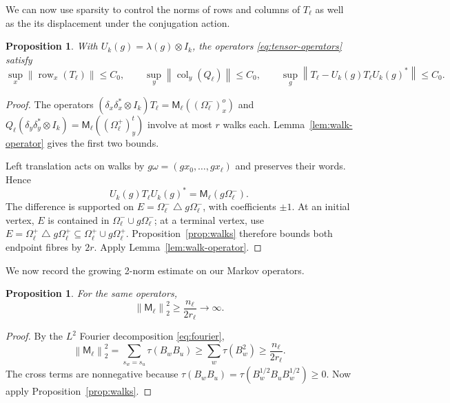 \documentclass[a4paper,11pt]{amsproc}
\numberwithin{equation}{section}
\newtheorem{proposition}[theorem]{Proposition}
\theoremstyle{definition}
\newcommand{\norm}[1]{\left\lVert#1\right\rVert}
\DeclareMathOperator{\row}{row}
\DeclareMathOperator{\col}{col}
\begin{document}
We can now use sparsity to control the norms of rows and columns of $T_\ell$ as well as the its displacement under the conjugation action.

\begin{proposition}\label{prop:uniform}
With $U_k(g)=\lambda(g)\otimes I_k$, the operators \eqref{eq:tensor-operators} satisfy
\begin{equation}\label{eq:uniform}
 \sup_x\norm{\row_x(T_\ell)}\le C_0,\qquad
 \sup_y\norm{\col_y(Q_\ell)}\le C_0,\qquad
 \sup_g\norm{T_\ell-U_k(g)T_\ell U_k(g)^*}\le C_0.
\end{equation}
\end{proposition}
\begin{proof}
The operators
$(\delta_x\delta_x^*\otimes I_k)T_\ell
=\mathsf M_\ell((\Omega_\ell^-)_x^o)$ and
$Q_\ell(\delta_y\delta_y^*\otimes I_k)
=\mathsf M_\ell((\Omega_\ell^+)_y^t)$
involve at most $r$ walks each. Lemma~\ref{lem:walk-operator} gives the first two bounds.

Left translation acts on walks by $g\omega=(gx_0,\ldots,gx_\ell)$ and preserves their words. Hence
\[
 U_k(g)T_\ell U_k(g)^*=\mathsf M_\ell(g\Omega_\ell^-).
\]
The difference is supported on $E=\Omega_\ell^-\mathbin{\triangle}g\Omega_\ell^-$, with coefficients $\pm1$. At an initial vertex, $E$ is contained in $\Omega_\ell^-\cup g\Omega_\ell^-$; at a terminal vertex, use
$E=\Omega_\ell^+\mathbin{\triangle}g\Omega_\ell^+\subseteq\Omega_\ell^+\cup g\Omega_\ell^+$.
Proposition~\ref{prop:walks} therefore bounds both endpoint fibres by $2r$. Apply Lemma~\ref{lem:walk-operator}.
\end{proof}

We now record the growing 2-norm estimate on our Markov operators.

\begin{proposition}\label{prop:growth}
For the same operators,
\begin{equation}\label{eq:growth}
 \norm{\mathsf M_\ell}_2^2\ge\frac{n_\ell}{2r_\ell}\longrightarrow\infty.
\end{equation}
\end{proposition}
\begin{proof}
By the $L^2$ Fourier decomposition \eqref{eq:fourier},
\begin{equation}\label{eq:energy}
 \norm{\mathsf M_\ell}_2^2
 =\sum_{s_w=s_u}\tau(B_wB_u)
 \ge\sum_w\tau(B_w^2)\ge\frac{n_\ell}{2r_\ell}.
\end{equation}
The cross terms are nonnegative because
$\tau(B_wB_u)=\tau(B_w^{1/2}B_uB_w^{1/2})\ge0$.
Now apply Proposition~\ref{prop:walks}.
\end{proof}
\end{document}
